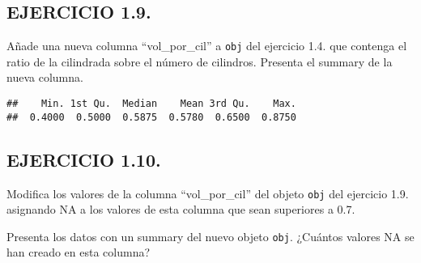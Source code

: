 \documentclass[]{article}
\newenvironment{Shaded}{\begin{snugshade}}{\end{snugshade}}
\newcommand{\CommentTok}[1]{\textcolor[rgb]{0.56,0.35,0.01}{\textit{#1}}}
\newcommand{\DecValTok}[1]{\textcolor[rgb]{0.00,0.00,0.81}{#1}}
\newcommand{\FloatTok}[1]{\textcolor[rgb]{0.00,0.00,0.81}{#1}}
\newcommand{\KeywordTok}[1]{\textcolor[rgb]{0.13,0.29,0.53}{\textbf{#1}}}
\newcommand{\NormalTok}[1]{#1}
\newcommand{\OperatorTok}[1]{\textcolor[rgb]{0.81,0.36,0.00}{\textbf{#1}}}
\newcommand{\OtherTok}[1]{\textcolor[rgb]{0.56,0.35,0.01}{#1}}
\newcommand{\StringTok}[1]{\textcolor[rgb]{0.31,0.60,0.02}{#1}}
\begin{document}
\hypertarget{ejercicio-1.9.}{%
\subsection{EJERCICIO 1.9.}\label{ejercicio-1.9.}}

Añade una nueva columna ``vol\_por\_cil'' a \texttt{obj} del ejercicio
1.4. que contenga el ratio de la cilindrada sobre el número de
cilindros. Presenta el summary de la nueva columna.

\begin{Shaded}
\end{Shaded}

\begin{verbatim}
##    Min. 1st Qu.  Median    Mean 3rd Qu.    Max. 
##  0.4000  0.5000  0.5875  0.5780  0.6500  0.8750
\end{verbatim}

\hypertarget{ejercicio-1.10.}{%
\subsection{EJERCICIO 1.10.}\label{ejercicio-1.10.}}

Modifica los valores de la columna ``vol\_por\_cil'' del objeto
\texttt{obj} del ejercicio 1.9. asignando NA a los valores de esta
columna que sean superiores a 0.7.

Presenta los datos con un summary del nuevo objeto \texttt{obj}.
¿Cuántos valores NA se han creado en esta columna?

\begin{Shaded}
\end{Shaded}
\end{document}
